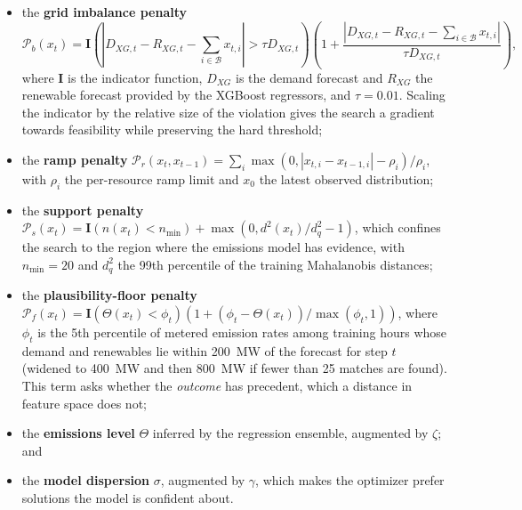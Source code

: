 \documentclass[11pt]{article}
\begin{document}
\begin{itemize}
\itemsep0.15em
\item the \textbf{grid imbalance penalty}
\begin{equation}
\mathcal{P}_b(x_t) = \mathbf{I}\!\left(\left|D_{XG,t} - R_{XG,t} - \sum_{i \in \mathcal{B}} x_{t,i}\right| > \tau D_{XG,t}\right)
\left(1 + \frac{\left|D_{XG,t} - R_{XG,t} - \sum_{i \in \mathcal{B}} x_{t,i}\right|}{\tau D_{XG,t}}\right),
\end{equation}
where $\mathbf{I}$ is the indicator function, $D_{XG}$ is the demand
forecast and $R_{XG}$ the renewable forecast provided by the XGBoost
regressors, and $\tau = 0.01$. Scaling the indicator by the relative size
of the violation gives the search a gradient towards feasibility while
preserving the hard threshold;

\item the \textbf{ramp penalty}
$\mathcal{P}_r(x_t, x_{t-1}) = \sum_{i} \max\!\left(0, |x_{t,i} - x_{t-1,i}| - \rho_i\right)/\rho_i$,
with $\rho_i$ the per-resource ramp limit and $x_0$ the latest observed
distribution;

\item the \textbf{support penalty}
$\mathcal{P}_s(x_t) = \mathbf{I}\!\left(n(x_t) < n_{\min}\right) + \max\!\left(0, d^2(x_t)/d^2_{q} - 1\right)$,
which confines the search to the region where the emissions model has
evidence, with $n_{\min} = 20$ and $d^2_q$ the 99th percentile of the
training Mahalanobis distances;

\item the \textbf{plausibility-floor penalty}
$\mathcal{P}_f(x_t) = \mathbf{I}\!\left(\Theta(x_t) < \phi_t\right)
\left(1 + (\phi_t - \Theta(x_t))/\max(\phi_t, 1)\right)$,
where $\phi_t$ is the 5th percentile of metered emission rates among
training hours whose demand and renewables lie within 200~MW of the
forecast for step $t$ (widened to 400~MW and then 800~MW if fewer than
25 matches are found). This term asks whether the \emph{outcome} has
precedent, which a distance in feature space does not;

\item the \textbf{emissions level} $\Theta$ inferred by the regression
ensemble, augmented by $\zeta$; and

\item the \textbf{model dispersion} $\sigma$, augmented by $\gamma$, which
makes the optimizer prefer solutions the model is confident about.
\end{itemize}
\end{document}

